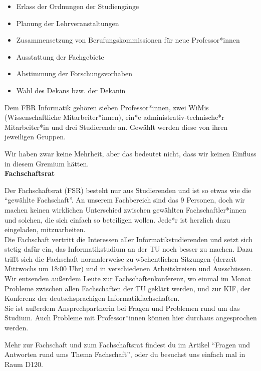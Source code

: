 {\begin{itemize}
\item Erlass der Ordnungen der Studiengänge
\item Planung der Lehrveranstaltungen
\item Zusammensetzung von Berufungskommissionen für neue Professor*innen
\item Ausstattung der Fachgebiete
\item Abstimmung der Forschungsvorhaben
\item Wahl des Dekans bzw. der Dekanin
\end{itemize}

Dem FBR Informatik gehören sieben Professor*innen, zwei WiMis (Wissenschaftliche Mitarbeiter*innen), ein*e administrativ-technische*r Mitarbeiter*in und drei Studierende an. Gewählt werden diese von ihren jeweiligen Gruppen.

Wir haben zwar keine Mehrheit, aber das bedeutet nicht, dass wir keinen Einfluss in diesem Gremium hätten. \\

\noindent\textbf{Fachschaftsrat}

Der Fachschaftsrat (FSR) besteht nur aus Studierenden und ist so etwas wie die "`gewählte Fachschaft"'. An unserem Fachbereich sind das 9 Personen, doch wir machen keinen wirklichen Unterschied zwischen gewählten Fachschaftler*innen und solchen, die sich einfach so beteiligen wollen. Jede*r ist herzlich dazu eingeladen, mitzuarbeiten.\\

Die Fachschaft vertritt die Interessen aller Informatikstudierenden und setzt sich stetig dafür ein, das Informatikstudium an der TU noch besser zu machen. Dazu trifft sich die Fachschaft normalerweise zu wöchentlichen Sitzungen (derzeit Mittwochs um 18:00 Uhr) und in verschiedenen Arbeitskreisen und Ausschüssen. Wir entsenden außerdem Leute zur Fachschaftenkonferenz, wo einmal im Monat Probleme zwischen allen Fachschaften der TU geklärt werden, und zur KIF, der Konferenz der deutschsprachigen Informatikfachschaften.\\

Sie ist außerdem Ansprechpartnerin bei Fragen und Problemen rund um das Studium. Auch Probleme mit Professor*innen können hier durchaus angesprochen werden.

Mehr zur Fachschaft und zum Fachschaftsrat findest du im Artikel "`Fragen und Antworten rund ums Thema Fachschaft"', oder du besuchst uns einfach mal in Raum D120.

}
